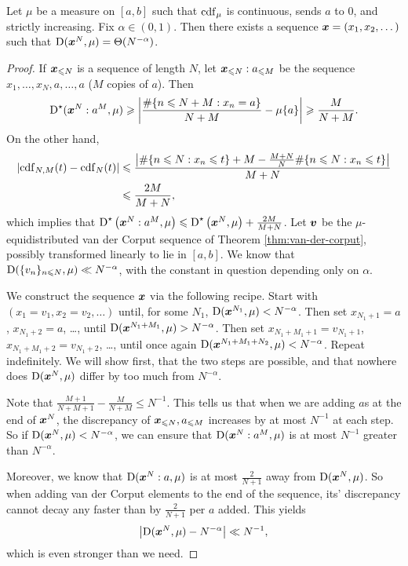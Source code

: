 \begin{theorem}\label{thm:discrepancy-arbitrary}
Let $\mu$ be a measure on $[a,b]$ such that $\operatorname{cdf}_\mu$ is continuous, 
sends $a$ to $0$, and strictly increasing. Fix $\alpha\in (0,1)$. Then there 
exists a sequence ${\boldsymbol x}=(x_1,x_2,\dots)$ such that 
$\operatorname{D}({\boldsymbol x}^N,\mu) = \Theta(N^{-\alpha})$. 
\end{theorem}
\begin{proof}
If ${\boldsymbol x}_{\leqslant N}$ is a sequence of length $N$, let 
${\boldsymbol x}_{\leqslant N}:a_{\leqslant M}$ be the sequence $x_1,\dots,x_N,a,\dots,a$ 
($M$ copies of $a$). Then 
\[
	\operatorname{D}^\star({\boldsymbol x}^N:a^M,\mu)
		\geqslant \left| \frac{\#\{ n\leqslant N+M : x_n = a\}}{N+M} - \mu\{a\}\right| 
		\geqslant \frac{M}{N+M} .
\]
On the other hand, 
\begin{align*}
	\left| \operatorname{cdf}_{N,M}(t) - \operatorname{cdf}_N(t)\right| 
		&\leqslant \frac{\left|\#\{n\leqslant N : x_n\leqslant t\} + M - \frac{M+N}{N}\#\{n\leqslant N : x_n\leqslant t\}\right|}{M+N} \\
		&\leqslant \frac{2M}{M+N} ,
\end{align*}
which implies that 
$\operatorname{D}^\star\left({\boldsymbol x}^N:a^M,\mu\right) \leqslant \operatorname{D}^\star\left({\boldsymbol x}^N,\mu\right) + \frac{2 M}{M+N}$. 
Let ${\boldsymbol v}$ be the $\mu$-equidistributed van der Corput sequence of 
Theorem \ref{thm:van-der-corput}, possibly transformed linearly to lie in 
$[a,b]$. We know that $\operatorname{D}(\{v_n\}_{n\leqslant N}, \mu) \ll N^{-\alpha}$, 
with the constant in question depending only on $\alpha$. 

We construct the sequence ${\boldsymbol x}$ via the following recipe. Start with 
$(x_1 = v_1,x_2 = v_2,\dots)$ until, for some $N_1$, 
$\operatorname{D}({\boldsymbol x}^{N_1},\mu) < N^{-\alpha}$. Then set $x_{N_1+1} = a$, 
$x_{N_1+2} = a$, \dots, until $\operatorname{D}({\boldsymbol x}^{N_1+M_1},\mu) > N^{-\alpha}$. 
Then set $x_{N_1+M_1+1} = v_{N_1+1}$, $x_{N_1+M_1+2} = v_{N_1+2}$, \dots, 
until once again $\operatorname{D}({\boldsymbol x}^{N_1+M_1+N_2},\mu) < N^{-\alpha}$. Repeat 
indefinitely. We will show first, that the two steps are possible, and 
that nowhere does $\operatorname{D}({\boldsymbol x}^N,\mu)$ differ by too much from $N^{-\alpha}$. 

Note that $\frac{M+1}{N+M+1} - \frac{M}{N+M} \leqslant N^{-1}$. This tells 
us that when we are adding $a$s at the end of ${\boldsymbol x}^N$, the discrepancy of 
${\boldsymbol x}_{\leqslant N},a_{\leqslant M}$ increases by at most $N^{-1}$ at each 
step. So if $\operatorname{D}({\boldsymbol x}^N,\mu) < N^{-\alpha}$, we can ensure that 
$\operatorname{D}({\boldsymbol x}^N:a^M,\mu)$ is at most $N^{-1}$ greater than $N^{-\alpha}$. 

Moreover, we know that $\operatorname{D}({\boldsymbol x}^N:a,\mu)$ is at most 
$\frac{2}{N+1}$ away from $\operatorname{D}({\boldsymbol x}^N,\mu)$. So when adding van der Corput 
elements to the end of the sequence, its' discrepancy cannot decay any faster 
than by $\frac{2}{N+1}$ per $a$ added. This yields 
\[
	\left|\operatorname{D}({\boldsymbol x}^N,\mu) - N^{-\alpha}\right| \ll N^{-1} , 
\]
which is even stronger than we need.
\end{proof}





